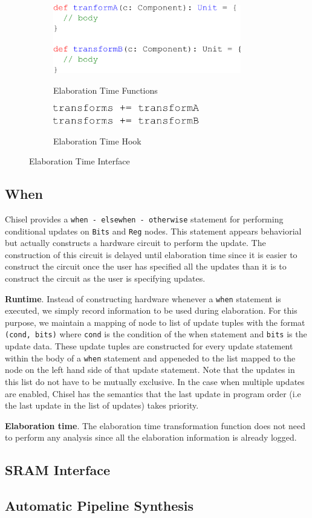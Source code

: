 \begin{figure}[htb]
\centering
  \begin{subfigure}[t]{0.48\textwidth}
  \centering
  \caption{Elaboration Time Functions}
  \includegraphics[width=0.9\textwidth]{figures/transform1.pdf}
  \label{fig:transform1}
  \end{subfigure}
  \hfill
  \begin{subfigure}[t]{0.48\textwidth}
  \centering
  \caption{Elaboration Time Hook}
  \includegraphics[width=0.7\textwidth]{figures/transform2.pdf}
  \label{fig:transform2}
  \end{subfigure}
\caption{Elaboration Time Interface}
\label{fig:transforms}
\end{figure}

\subsection{When}
Chisel provides a {\tt when - elsewhen - otherwise} statement for
performing conditional updates on {\tt Bits} and {\tt Reg}
nodes. This statement appears behaviorial but actually constructs a
hardware circuit to perform the update. The construction of this
circuit is delayed until elaboration time since it is easier to
construct the circuit once the user has specified all the updates than
it is to construct the circuit as the user is specifying
updates. 

{\bf Runtime}. Instead of constructing hardware whenever a {\tt when}
statement is executed, we simply record information to be used during
elaboration. For this purpose, we maintain a mapping of node to list
of update tuples with the format {\tt (cond, bits)} where {\tt cond}
is the condition of the when statement and {\tt bits} is the update
data. These update tuples are constructed for every update statement
within the body of a {\tt when} statement and appeneded to the list
mapped to the node on the left hand side of that update
statement. Note that the updates in this list do not have to be
mutually exclusive. In the case when multiple updates are enabled,
Chisel has the semantics that the last update in program order (i.e
the last update in the list of updates) takes priority.

{\bf Elaboration time}. The elaboration time transformation function
does not need to perform any analysis since all the elaboration
information is already logged.

\subsection{SRAM Interface}

\subsection{Automatic Pipeline Synthesis}
